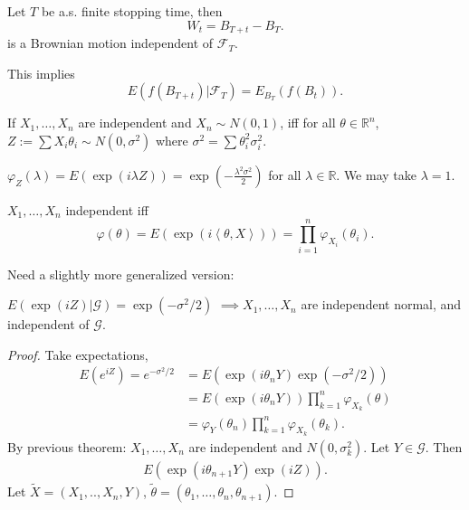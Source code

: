 
\begin{theorem}
	Let $T$ be a.s. finite stopping time, then
	\[
		W_t = B_{T + t} - B_T
	.\] 
	is a Brownian motion independent of $\mathcal{F}_T$.
\end{theorem}
\begin{remark}
	This implies
	\[
		E\left( f(B_{T + t}) | \mathcal{F}_T \right) 
		= E_{B_T}\left( f(B_t) \right) 
	.\] 
\end{remark}

\begin{theorem}
	If $X_1, \ldots, X_n$ are independent and $X_n \sim  N(0,1)$, iff for all $\theta \in \mathbb{R}^n$, $Z := \sum X_i \theta_i \sim N(0,\sigma^2)$ where $\sigma^2 = \sum \theta_i^2 \sigma_i^2$. 

	$\varphi_Z(\lambda) = E\left( \exp\left( i \lambda Z \right)  \right) = \exp\left( - \frac{\lambda^2 \sigma^2}{2} \right) $  for all $\lambda \in \mathbb{R}$. We may take $\lambda = 1$.
\end{theorem}

\begin{lemma}
	$X_1, \ldots, X_n$ independent iff 
	\[
		\varphi(\theta) = E\left( \exp\left( i \left\langle \theta, X \right\rangle  \right)  \right) = \prod_{i=1}^{n} \varphi_{X_i}(\theta_i) 
	.\] 
\end{lemma}

Need a slightly more generalized version:

\begin{lemma}
	$E\left( \exp\left( i Z \right) | \mathcal{G} \right) = \exp\left( - \sigma^2 / 2 \right) $
	$\implies X_1, \ldots, X_n$ are independent normal, and independent of $\mathcal{G}$.
\end{lemma}
\begin{proof}
	Take expectations,
	\begin{align*}
		E\left( e^{i Z} \right) = e^{- \sigma^2 / 2}
		&= E\left( \exp\left( i \theta_n Y \right) \exp(- \sigma^2 / 2)\right)  \\
		&= E\left( \exp(i \theta_n Y) \right) \prod_{k=1}^{n} \varphi_{X_k}(\theta)  \\
		&= \varphi_{Y}(\theta_n) \prod_{k=1}^{n} \varphi_{X_k}(\theta_k)  
	.\end{align*} 
	By previous theorem: $X_1, \ldots, X_n$ are independent and $N(0, \sigma^2_k)$. Let $Y \in \mathcal{G}$. Then
	\begin{align*}
		E\left( \exp(i \theta_{n+1} Y) \exp(i Z) \right) 
	.\end{align*}
	Let $\tilde X = \left( X_1, .., X_n, Y \right) $, $\tilde \theta = \left( \theta_1, \ldots, \theta_n, \theta_{n+1} \right) $. 
\end{proof}

